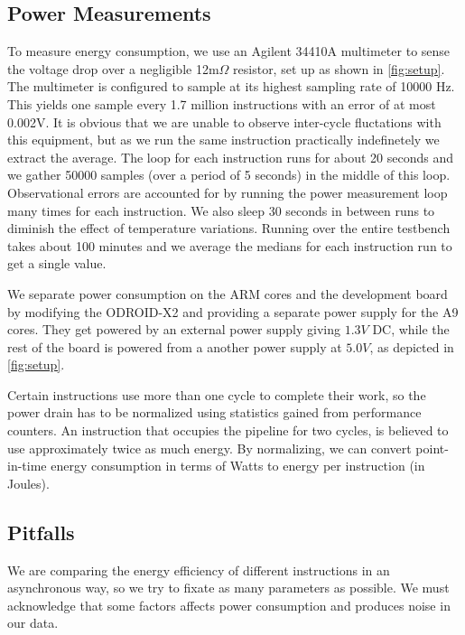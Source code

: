 \subsection{Power Measurements}
To measure energy consumption, we use an Agilent 34410A
multimeter\cite{agilent34410a} to sense the voltage drop over a negligible
12m$\Omega$ resistor, set up as shown in \autoref{fig:setup}. The multimeter is
configured to sample at its highest sampling rate of 10000 Hz. This yields one
sample every 1.7 million instructions with an error of at most
0.002V. It is obvious that we are unable to observe inter-cycle
fluctations with this equipment, but as we run the same instruction practically
indefinetely we extract the average. The loop for each instruction runs for
about 20 seconds and we gather 50000 samples (over a period of 5 seconds) in the
middle of this loop. Observational errors are accounted for by running the power
measurement loop many times for each instruction. We also sleep 30 seconds in
between runs to diminish the effect of temperature variations. Running over the
entire testbench takes about 100 minutes and we average the medians for each
instruction run to get a single value.

We separate power consumption on the ARM cores and the development board by
modifying the ODROID-X2 and providing a separate power supply for the A9 cores.
They get powered by an external power supply giving $1.3V$ DC, while the rest of
the board is powered from a another power supply at $5.0V$, as depicted in
\autoref{fig:setup}.

Certain instructions use more than one cycle to complete their work, so the
power drain has to be normalized using statistics gained from performance
counters. An instruction that occupies the pipeline for two cycles, is believed
to use approximately twice as much energy. By normalizing, we can convert
point-in-time energy consumption in terms of Watts to energy per instruction (in
Joules).


\subsection{Pitfalls}
We are comparing the energy efficiency of different instructions in an
asynchronous way, so we try to fixate as many parameters as possible. We must
acknowledge that some factors affects power consumption and produces noise in
our data.

